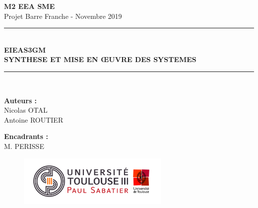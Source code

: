 \begin{titlepage}
    \begin{center}
    \huge{\textbf{M2 EEA SME}}\\[0.5 cm]
    {\large Projet Barre Franche - Novembre 2019}\\[0.5cm]
    
    \rule{\linewidth}{0.5mm} \\[0.4cm]
    {\huge \bfseries EIEAS3GM \\ SYNTHESE ET MISE EN ŒUVRE DES SYSTEMES\\[0.4cm]}
    \rule{\linewidth}{0.5mm} \\[1.5cm]
    
    
    
    \begin{center}
    \begin{minipage}[t]{0.46\textwidth}
      \begin{flushleft} \large
        \textbf{Auteurs :}\\
        Nicolas OTAL\\
        Antoine ROUTIER\\
      \end{flushleft}
    \end{minipage}
    \begin{minipage}[t]{0.46\textwidth}
      \begin{flushright} \large
        \textbf{Encadrants :}\\
        M. PERISSE\\
      \end{flushright}
    \end{minipage}
    \end{center}
    
    \vfill
    
    
    \begin{figure}[b]
    \centering
    \includegraphics[width=0.65\textwidth]{images/Upstls.jpg}
    \end{figure}
    
    \end{center}
    \end{titlepage}